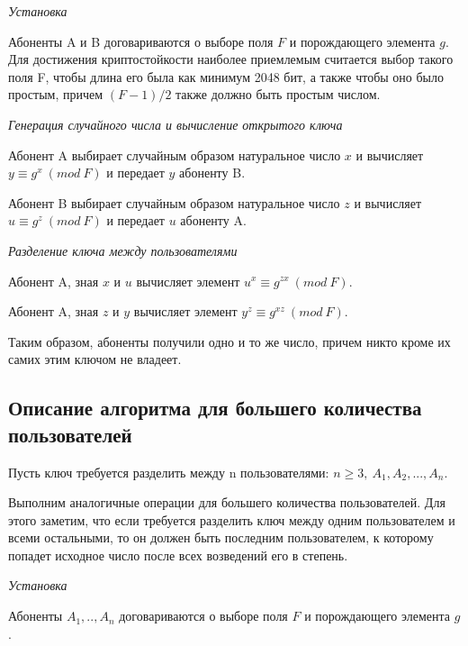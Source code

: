 \documentclass[bachelor, och, labwork]{shiza}
\begin{document}
\begin{center}
    \textit{Установка}
\end{center}

Абоненты A и B договариваются о выборе поля $F$ и порождающего элемента $g$.
Для достижения криптостойкости наиболее приемлемым считается выбор такого поля
F, чтобы длина его была как минимум 2048 бит, а также чтобы оно было простым, 
причем $(F - 1 )/ 2$ также должно быть простым числом.

\begin{center}
    \textit{Генерация случайного числа и вычисление открытого ключа}
\end{center}

Абонент A выбирает случайным образом натуральное число $x$ и вычисляет $y \equiv g^x ~(mod ~F)$
и передает $y$ абоненту B.

Абонент B выбирает случайным образом натуральное число $z$ и вычисляет $u \equiv g^z ~(mod ~F)$
и передает $u$ абоненту A.

\begin{center}
    \textit{Разделение ключа между пользователями}
\end{center}

Абонент A, зная $x$ и $u$ вычисляет элемент $u^x \equiv g^{zx} ~(mod~F)$.

Абонент A, зная $z$ и $y$ вычисляет элемент $y^z \equiv g^{xz} ~(mod~F)$.

Таким образом, абоненты получили одно и то же число, причем никто кроме их самих
этим ключом не владеет.

\subsection{Описание алгоритма для большего количества пользователей}

Пусть ключ требуется разделить между n пользователями: $n \geqslant 3, ~ A_1,A_2, ...,A_n$.

Выполним аналогичные операции для большего количества пользователей. Для этого
заметим, что если требуется разделить ключ между одним пользователем и всеми
остальными, то он должен быть последним пользователем, к которому попадет исходное
число после всех возведений его в степень.

\begin{center}
    \textit{Установка}
\end{center}
Абоненты $A_1,..,A_n$ договариваются о выборе поля $F$ и порождающего элемента $g$.
\end{document}
